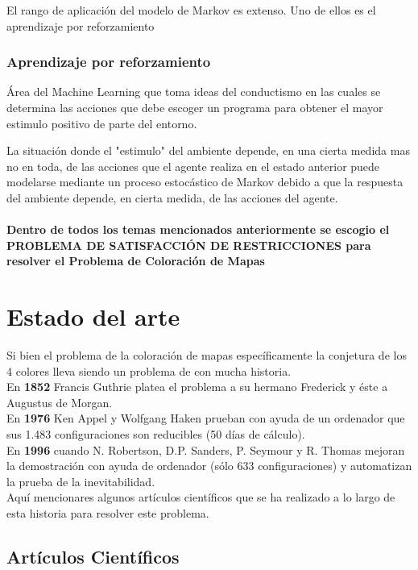 \documentclass[a4paper]{article}
\begin{document}
El rango de aplicación del modelo de Markov es extenso. Uno de ellos es el aprendizaje por reforzamiento

\subsubsection*{Aprendizaje por reforzamiento}
Área del Machine Learning que toma ideas del conductismo en las cuales se determina las acciones que debe escoger un programa para obtener el mayor estimulo positivo de parte del entorno.

La situación donde el "estimulo" del ambiente depende, en una cierta medida mas no en toda, de las acciones que el agente realiza en el estado anterior puede modelarse mediante un proceso estocástico de Markov debido a que la respuesta del ambiente depende, en cierta medida, de las acciones del agente.\\\\

\textbf{
Dentro de todos los temas mencionados anteriormente se escogio el PROBLEMA DE SATISFACCIÓN DE RESTRICCIONES para resolver el Problema de Coloraci\'on de Mapas}

\pagebreak

\section{Estado del arte}

Si bien el problema de la coloración de mapas específicamente la conjetura de los 4 colores lleva siendo un problema de con mucha historia.\\
En \textbf{1852} Francis Guthrie platea el problema a su hermano Frederick y éste a Augustus de Morgan.\\
En \textbf{1976} Ken Appel y Wolfgang Haken prueban con ayuda de un ordenador que sus 1.483 configuraciones son reducibles (50 días de cálculo).\\
En \textbf{1996} cuando N. Robertson, D.P. Sanders, P. Seymour y R. Thomas mejoran la demostración con ayuda de ordenador (sólo 633 configuraciones) y automatizan la prueba de la inevitabilidad.\\

Aquí mencionares algunos artículos científicos que se ha realizado a lo largo de esta historia para resolver este problema. 

\subsection{Artículos Científicos}
\end{document}

